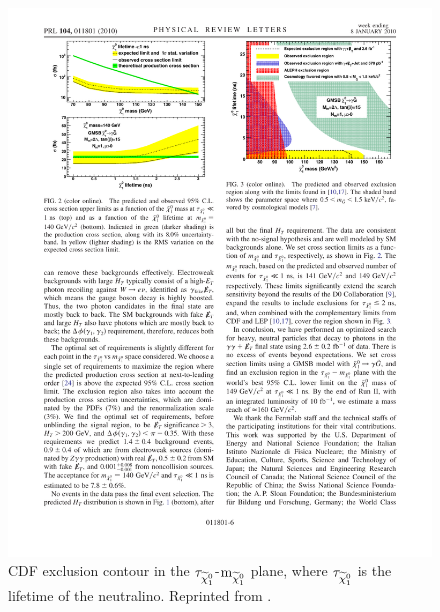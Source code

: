 \documentclass[dissertation.tex]{subfiles}
\begin{document}
\begin{figure}
	\centering
	\includegraphics[scale=1.0]{CDF_lifetime_vs_mass}
	\caption{CDF exclusion contour in the $\tau_{\widetilde{\chi}_{1}^{0}}$-$\mbox{m}_{\widetilde{\chi}_{1}^{0}}$ plane, where $\tau_{\widetilde{\chi}_{1}^{0}}$ is the lifetime of the neutralino.  Reprinted from \cite{CDF_2010_GMSB_paper}.}
	\label{fig:CDF_lifetime_vs_mass}
\end{figure}
\end{document}
